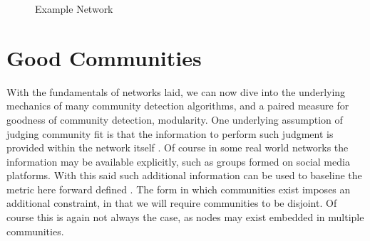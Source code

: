 \documentclass[a4paper, 10pt, twocolumn]{article}
\begin{document}
\begin{figure}[t]
       \centering
       \caption{Example Network}
       \label{fig:ex_network}
\end{figure}    


\section{Good Communities}

With the fundamentals of networks laid, we can now dive into the underlying mechanics of many community detection algorithms, and a paired measure for goodness of community detection, modularity. 
One underlying assumption of judging community fit is that the information to perform such judgment is provided within the network itself \cite{network_science}. 
Of course in some real world networks the information may be available explicitly, such as groups formed on social media platforms. 
With this said such additional information can be used to baseline the metric here forward defined \cite{finding_and_evaling_comm_struct}.
The form in which communities exist imposes an additional constraint, in that we will require communities to be disjoint. 
Of course this is again not always the case, as nodes may exist embedded in multiple communities. 
\end{document}
